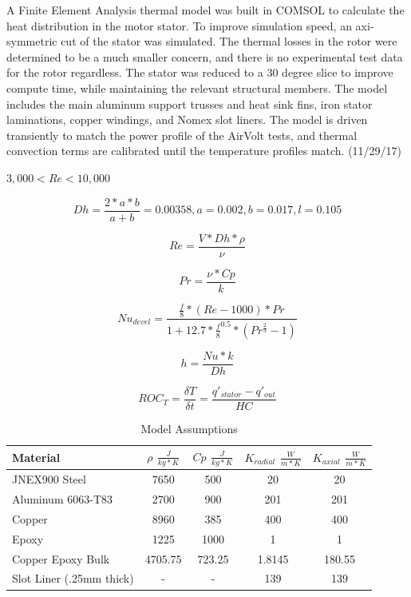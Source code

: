 \documentclass[]{aiaa-tc}%
\begin{document}
A Finite Element Analysis thermal model was built in COMSOL to calculate the heat distribution in the motor stator. To improve simulation speed, an axi-symmetric cut of the stator was simulated. The thermal losses in the rotor were determined to be a much smaller concern, and there is no experimental test data for the rotor regardless. The stator was reduced to a 30 degree slice to improve compute time, while maintaining the relevant structural members. The model includes the main aluminum support trusses and heat sink fins, iron stator laminations, copper windings, and Nomex slot liners. The model is driven transiently to match the power profile of the AirVolt tests, and thermal convection terms are calibrated until the temperature profiles match. (11/29/17)

$3,000<Re<10,000$

\begin{equation}
Dh = \frac{2*a*b}{a+b} = 0.00358,
a = 0.002, b = 0.017, l = 0.105
\label{eq:Dh}
\end{equation}

\begin{equation}
Re = \frac{V*Dh*\rho}{\nu}
\label{eq:Re}
\end{equation}

\begin{equation}
Pr = \frac{\nu*Cp}{k}
\label{eq:Pr}
\end{equation}

\begin{equation}
Nu_{devel} = \frac{\frac{f}{8}*(Re-1000)*Pr}{1+12.7*\frac{f}{8}^{0.5}*(Pr^{\frac{2}{3}}-1)}
\label{eq:Nu}
\end{equation}

\begin{equation}
h = \frac{Nu*k}{Dh}
\label{eq:h}
\end{equation}

\begin{equation}
ROC_{T} = \frac{\delta T}{\delta t} = \frac{q'_{stator}-q'_{out}}{HC}
\label{eq:ROC}
\end{equation}

\begin{table}[hbt!]
\caption{\label{tab:COMSOL} Model Assumptions}
\centering
\begin{tabular}{lcccc}
Material  & $\rho$ $\frac{J}{kg*K}$ & $Cp$ $\frac{J}{kg*K}$  & $K_{radial}$ $\frac{W}{m*K}$ & $K_{axial}$ $\frac{W}{m*K}$\\\hline
JNEX900 Steel & 7650& 500& 20& 20\\
Aluminum 6063-T83   & 2700  & 900 & 201& 201  \\
Copper & 8960 & 385 & 400& 400\\
Epoxy & 1225 & 1000 & 1& 1 \\
Copper Epoxy Bulk & 4705.75 & 723.25 & 1.8145 & 180.55\\
Slot Liner (.25mm thick) &-&-&139 & 139\\\hline
\end{tabular}
\end{table}
\end{document}
